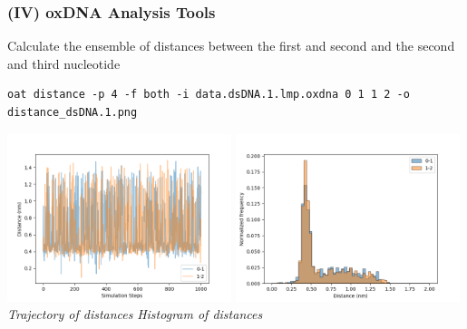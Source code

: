 \documentclass[slidestop,compress,9pt]{beamer}
\begin{document}
\begin{frame}[fragile]
\frametitle{(IV) oxDNA Analysis Tools}

Calculate the ensemble of distances between the first and second and the second and third nucleotide

\begin{lstlisting}
oat distance -p 4 -f both -i data.dsDNA.1.lmp.oxdna 0 1 1 2 -o distance_dsDNA.1.png
\end{lstlisting}
\begin{center}
\includegraphics[width=0.49\textwidth]{distance_dsDNA_traj.1.png}
\includegraphics[width=0.49\textwidth]{distance_dsDNA_hist.1.png}\\
\textit{Trajectory of distances}
\hspace*{3cm}
\textit{Histogram of distances}
\end{center}
\end{frame}
\end{document}
